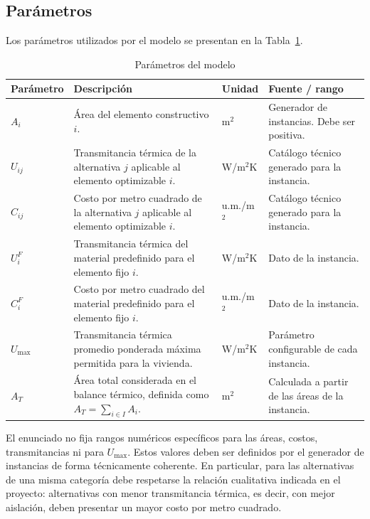 \subsection{Parámetros}

Los parámetros utilizados por el modelo se presentan en la
Tabla~\ref{tab:parametros}.

\begin{table}[h]
\centering
\caption{Parámetros del modelo}
\label{tab:parametros}
\begin{tabular}{|p{2.2cm}|p{5.3cm}|p{2.3cm}|p{3.2cm}|}
\hline
\textbf{Parámetro} & \textbf{Descripción} & \textbf{Unidad} & \textbf{Fuente / rango} \\ \hline
$A_i$ & Área del elemento constructivo $i$. & m$^2$ & Generador de instancias. Debe ser positiva. \\ \hline
$U_{ij}$ & Transmitancia térmica de la alternativa $j$ aplicable al elemento optimizable $i$. & W/m$^2$K & Catálogo técnico generado para la instancia. \\ \hline
$C_{ij}$ & Costo por metro cuadrado de la alternativa $j$ aplicable al elemento optimizable $i$. & u.m./m$^2$ & Catálogo técnico generado para la instancia. \\ \hline
$U_i^{F}$ & Transmitancia térmica del material predefinido para el elemento fijo $i$. & W/m$^2$K & Dato de la instancia. \\ \hline
$C_i^{F}$ & Costo por metro cuadrado del material predefinido para el elemento fijo $i$. & u.m./m$^2$ & Dato de la instancia. \\ \hline
$U_{\max}$ & Transmitancia térmica promedio ponderada máxima permitida para la vivienda. & W/m$^2$K & Parámetro configurable de cada instancia. \\ \hline
$A_T$ & Área total considerada en el balance térmico, definida como $A_T=\sum_{i\in I}A_i$. & m$^2$ & Calculada a partir de las áreas de la instancia. \\ \hline
\end{tabular}
\end{table}

El enunciado no fija rangos numéricos específicos para las áreas, costos,
transmitancias ni para $U_{\max}$. Estos valores deben ser definidos por el
generador de instancias de forma técnicamente coherente. En particular, para
las alternativas de una misma categoría debe respetarse la relación
cualitativa indicada en el proyecto: alternativas con menor transmitancia
térmica, es decir, con mejor aislación, deben presentar un mayor costo por
metro cuadrado.

